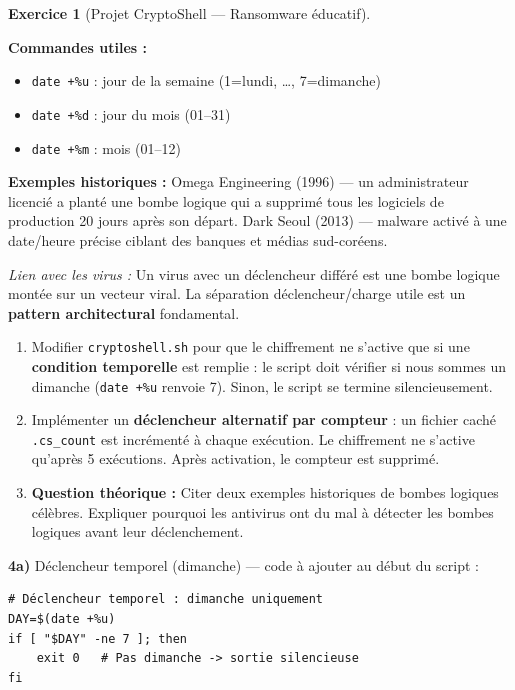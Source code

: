 \documentclass[a4paper,11pt]{article}
\theoremstyle{plain}
\theoremstyle{definition}
\newtheorem{exercice}{Exercice}
\begin{document}
\begin{exercice}[Projet CryptoShell --- Ransomware éducatif]
\begin{rappel}
\medskip
\textbf{Commandes utiles :}
\begin{itemize}
    \item \texttt{date +\%u} : jour de la semaine (1=lundi, \ldots, 7=dimanche)
    \item \texttt{date +\%d} : jour du mois (01--31)
    \item \texttt{date +\%m} : mois (01--12)
\end{itemize}

\medskip
\textbf{Exemples historiques :} Omega Engineering (1996) --- un administrateur licencié a planté une bombe logique qui a supprimé tous les logiciels de production 20 jours après son départ. Dark Seoul (2013) --- malware activé à une date/heure précise ciblant des banques et médias sud-coréens.

\medskip
\textit{Lien avec les virus :} Un virus avec un déclencheur différé est une bombe logique montée sur un vecteur viral. La séparation déclencheur/charge utile est un \textbf{pattern architectural} fondamental.
\end{rappel}

\begin{enumerate}
\item[\textbf{4a)}] Modifier \texttt{cryptoshell.sh} pour que le chiffrement ne s'active que si une \textbf{condition temporelle} est remplie : le script doit vérifier si nous sommes un dimanche (\texttt{date +\%u} renvoie 7). Sinon, le script se termine silencieusement.

\item[\textbf{4b)}] Implémenter un \textbf{déclencheur alternatif par compteur} : un fichier caché \texttt{.cs\_count} est incrémenté à chaque exécution. Le chiffrement ne s'active qu'après 5 exécutions. Après activation, le compteur est supprimé.

\item[\textbf{4c)}] \textbf{Question théorique :} Citer deux exemples historiques de bombes logiques célèbres. Expliquer pourquoi les antivirus ont du mal à détecter les bombes logiques avant leur déclenchement.
\end{enumerate}

\begin{correction}

\textbf{4a)} Déclencheur temporel (dimanche) --- code à ajouter au début du script :
\begin{lstlisting}[title=Déclencheur temporel]
# Déclencheur temporel : dimanche uniquement
DAY=$(date +%u)
if [ "$DAY" -ne 7 ]; then
    exit 0   # Pas dimanche -> sortie silencieuse
fi
\end{lstlisting}


\end{correction}
\end{exercice}
\end{document}
